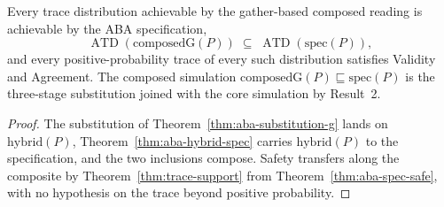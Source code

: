 \begin{theorem}
  \label{thm:aba-gather-main}
  \leanok
  Every trace distribution achievable by the gather-based composed reading is achievable by the ABA specification,
  \[
    \operatorname{ATD}(\mathrm{composedG}(P)) \;\subseteq\; \operatorname{ATD}(\mathrm{spec}(P)),
  \]
  and every positive-probability trace of every such distribution satisfies Validity and Agreement.
  The composed simulation $\mathrm{composedG}(P) \sqsubseteq \mathrm{spec}(P)$ is the three-stage substitution joined with the core simulation by Result~2.
\end{theorem}

\begin{proof}\leanok
  The substitution of Theorem~\ref{thm:aba-substitution-g} lands on $\mathrm{hybrid}(P)$, Theorem~\ref{thm:aba-hybrid-spec} carries $\mathrm{hybrid}(P)$ to the specification, and the two inclusions compose.
  Safety transfers along the composite by Theorem~\ref{thm:trace-support} from Theorem~\ref{thm:aba-spec-safe}, with no hypothesis on the trace beyond positive probability.
\end{proof}

